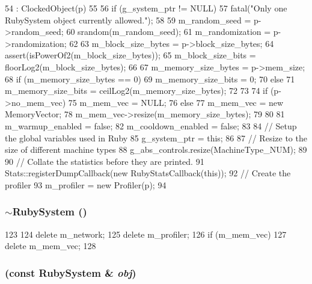 \begin{DoxyCode}
54     : ClockedObject(p)
55 {
56     if (g_system_ptr != NULL)
57         fatal("Only one RubySystem object currently allowed.\n");
58 
59     m_random_seed = p->random_seed;
60     srandom(m_random_seed);
61     m_randomization = p->randomization;
62 
63     m_block_size_bytes = p->block_size_bytes;
64     assert(isPowerOf2(m_block_size_bytes));
65     m_block_size_bits = floorLog2(m_block_size_bytes);
66 
67     m_memory_size_bytes = p->mem_size;
68     if (m_memory_size_bytes == 0) {
69         m_memory_size_bits = 0;
70     } else {
71         m_memory_size_bits = ceilLog2(m_memory_size_bytes);
72     }
73 
74     if (p->no_mem_vec) {
75         m_mem_vec = NULL;
76     } else {
77         m_mem_vec = new MemoryVector;
78         m_mem_vec->resize(m_memory_size_bytes);
79     }
80 
81     m_warmup_enabled = false;
82     m_cooldown_enabled = false;
83 
84     // Setup the global variables used in Ruby
85     g_system_ptr = this;
86 
87     // Resize to the size of different machine types
88     g_abs_controls.resize(MachineType_NUM);
89 
90     // Collate the statistics before they are printed.
91     Stats::registerDumpCallback(new RubyStatsCallback(this));
92     // Create the profiler
93     m_profiler = new Profiler(p);
94 }
\end{DoxyCode}
\hypertarget{classRubySystem_a335c948aafcd4d981ba75e02f1b33500}{
\subsubsection[{$\sim$RubySystem}]{\setlength{\rightskip}{0pt plus 5cm}$\sim${\bf RubySystem} ()}}
\label{classRubySystem_a335c948aafcd4d981ba75e02f1b33500}



\begin{DoxyCode}
123 {
124     delete m_network;
125     delete m_profiler;
126     if (m_mem_vec)
127         delete m_mem_vec;
128 }
\end{DoxyCode}
\hypertarget{classRubySystem_a273c873452012ea56ae230db703d5c53}{
\subsubsection[{RubySystem}]{ (const {\bf RubySystem} \& {\em obj})}}
\label{classRubySystem_a273c873452012ea56ae230db703d5c53}


